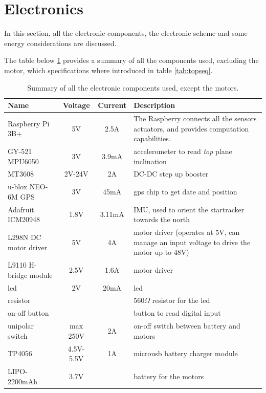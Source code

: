 \documentclass[]{article}
\begin{document}
\newpage
\section{Electronics}
In this section, all the electronic components, the electronic scheme and some energy considerations are discussed. 

The table below \ref{tab:elecsummary} provides a summary of all the components used, excluding the motor, which specifications where introduced in table \ref{tab:topseq}.

\begin{table}[H]
	\centering
	\def\arraystretch{1.5}
	\begin{tabularx}{\linewidth}{|X|c|c|X|}
		\hline
		\textbf{Name} & \textbf{Voltage} & \textbf{Current} & \textbf{Description} \\
		\hline
		Raspberry Pi 3B+ & 5V & 2.5A & The Raspberry connects all the sensors actuators, and provides computation capabilities. \\
		\hline 
		GY-521 MPU6050 & 3V & 3.9mA & accelerometer to read \textit{top} plane inclination \\
		\hline
		MT3608 & 2V-24V & 2A & DC-DC step up booster \\
		\hline
		u-blox NEO-6M GPS & 3V & 45mA & gps chip to get date and position \\
		\hline
		Adafruit ICM20948 & 1.8V & 3.11mA  & IMU, used to orient the startracker towards the north \\
		\hline
	 	L298N DC motor driver & 5V & 4A & motor driver (operates at 5V, can manage an input voltage to drive the motor up to 48V) \\
	 	\hline
 		L9110 H-bridge module & 2.5V & 1.6A & motor driver \\
	 	\hline
	 	led & 2V & 20mA & led \\
	 	\hline
	 	resistor & & & $560 \Omega$ resistor for the led \\
	 	\hline
	 	on-off button & & & button to read digital input \\
	 	\hline
	 	unipolar switch & max 250V & 2A & on-off switch between battery and motors \\
	 	\hline
	 	TP4056 & 4.5V-5.5V & 1A & microusb battery charger module \\
	 	\hline
	 	LIPO-2200mAh & 3.7V & & battery for the motors \\
	 	\hline
	\end{tabularx}
	\caption{Summary of all the electronic components used, except the motors.}
	\label{tab:elecsummary}
\end{table}
\end{document}
